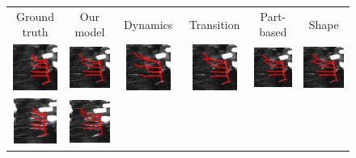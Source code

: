 \documentclass{article}
\begin{document}
\begin{figure}[t!]
	\vspace{-10pt}
	\centering
	\begin{tabular}{cccccc} 
		\footnotesize{Ground truth} & \footnotesize{Our model} & \footnotesize{Dynamics} & \footnotesize{Transition} & \footnotesize{Part-based} & \footnotesize{Shape} \vspace{-2pt} \\
		{\includegraphics[height=1.5cm,width=2.3cm]{img/gt_t2.png}} &
		{\includegraphics[height=1.5cm,width=2.3cm]{img/all_t2.png}} &
		{\includegraphics[height=1.5cm,width=2.3cm]{img/dyna_t2.png}} &
		{\includegraphics[height=1.5cm,width=2.3cm]{img/tran_t2.png}} &  
		{\includegraphics[height=1.5cm,width=2.3cm]{img/repul_t2.png}} &  
		{\includegraphics[height=1.5cm,width=2.3cm]{img/shape_t2.png}}  \\
		{\includegraphics[height=1.5cm,width=2.3cm]{img/gt_t3.png}} &
		{\includegraphics[height=1.5cm,width=2.3cm]{img/all_t3.png}} &

\end{tabular}
\end{figure}
\end{document}
